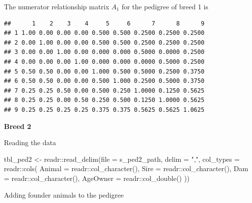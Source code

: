 \documentclass[
]{article}
\newenvironment{Shaded}{\begin{snugshade}}{\end{snugshade}}
\newcommand{\AttributeTok}[1]{\textcolor[rgb]{0.77,0.63,0.00}{#1}}
\newcommand{\FunctionTok}[1]{\textcolor[rgb]{0.00,0.00,0.00}{#1}}
\newcommand{\NormalTok}[1]{#1}
\newcommand{\OtherTok}[1]{\textcolor[rgb]{0.56,0.35,0.01}{#1}}
\newcommand{\SpecialCharTok}[1]{\textcolor[rgb]{0.00,0.00,0.00}{#1}}
\newcommand{\StringTok}[1]{\textcolor[rgb]{0.31,0.60,0.02}{#1}}
\begin{document}
The numerator relationship matrix \(A_1\) for the pedigree of breed 1 is

\begin{verbatim}
##      1    2    3    4     5     6      7      8      9
## 1 1.00 0.00 0.00 0.00 0.500 0.500 0.2500 0.2500 0.2500
## 2 0.00 1.00 0.00 0.00 0.500 0.500 0.2500 0.2500 0.2500
## 3 0.00 0.00 1.00 0.00 0.000 0.000 0.5000 0.0000 0.2500
## 4 0.00 0.00 0.00 1.00 0.000 0.000 0.0000 0.5000 0.2500
## 5 0.50 0.50 0.00 0.00 1.000 0.500 0.5000 0.2500 0.3750
## 6 0.50 0.50 0.00 0.00 0.500 1.000 0.2500 0.5000 0.3750
## 7 0.25 0.25 0.50 0.00 0.500 0.250 1.0000 0.1250 0.5625
## 8 0.25 0.25 0.00 0.50 0.250 0.500 0.1250 1.0000 0.5625
## 9 0.25 0.25 0.25 0.25 0.375 0.375 0.5625 0.5625 1.0625
\end{verbatim}

\textbf{Breed 2}

Reading the data

\begin{Shaded}
\begin{Highlighting}[]
\NormalTok{tbl\_ped2 }\OtherTok{\textless{}{-}}\NormalTok{ readr}\SpecialCharTok{::}\FunctionTok{read\_delim}\NormalTok{(}\AttributeTok{file =}\NormalTok{ s\_ped2\_path,}
                              \AttributeTok{delim =} \StringTok{","}\NormalTok{,}
                              \AttributeTok{col\_types =}\NormalTok{ readr}\SpecialCharTok{::}\FunctionTok{cols}\NormalTok{(}
                                \AttributeTok{Animal =}\NormalTok{ readr}\SpecialCharTok{::}\FunctionTok{col\_character}\NormalTok{(),}
                                \AttributeTok{Sire =}\NormalTok{ readr}\SpecialCharTok{::}\FunctionTok{col\_character}\NormalTok{(),}
                                \AttributeTok{Dam =}\NormalTok{ readr}\SpecialCharTok{::}\FunctionTok{col\_character}\NormalTok{(),}
                                \AttributeTok{AgeOwner =}\NormalTok{ readr}\SpecialCharTok{::}\FunctionTok{col\_double}\NormalTok{()}
\NormalTok{                              ))}
\end{Highlighting}
\end{Shaded}

Adding founder animals to the pedigree
\end{document}
